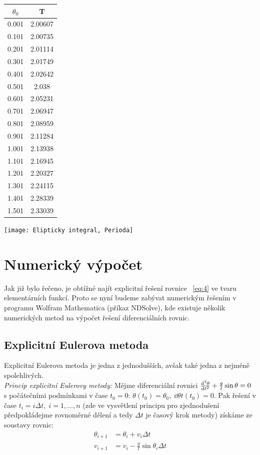 \documentclass[reqno, a4paper]{amsart}
\begin{document}
\begin{minipage}{\textwidth}
\begin{minipage}[b]{0.2\textwidth}
\centering
\begin{tabular}{|c|c|}
\hline
$\theta_{0}$ & T \\ 
\hline
0.001& 2.00607\\0.101& 2.00735\\0.201& 2.01114\\0.301& 2.01749\\0.401& 2.02642\\0.501& 2.038\\0.601& 2.05231\\0.701& 2.06947\\0.801& 2.08959\\0.901& 2.11284\\
1.001& 2.13938\\1.101& 2.16945\\1.201& 2.20327\\1.301& 2.24115\\1.401& 2.28339\\1.501& 2.33039\\
\hline
\end{tabular}
\end{minipage}
\begin{minipage}[b]{0.79\textwidth}
\centering
\texttt{[image: Elipticky integral, Perioda]}
\end{minipage}
\hfill
\end{minipage}

\section{Numerický výpočet}
Jak již bylo řečeno, je obtížné najít explicitní řešení rovnice ~\eqref{eq:4} ve tvaru elementárních funkcí. Proto se nyní budeme zabývat numerickým řešením v programu Wolfram Mathematica (příkaz NDSolve), kde existuje několik numerických metod na výpočet řešení diferenciálních rovnic.
\subsection{Explicitní Eulerova metoda}
Explicitní Eulerova metoda je jedna z jednodušších, avšak také jedna z nejméně spolehlivých.
\\
\textit{Princip explicitní Eulerovy metody:} Mějme diferenciální rovnici $\frac{\mathrm{d}^2 {\theta}}{\mathrm{d} {t}^2} + \frac{g}{l} \sin \theta = 0$ s počátečními podmínkami v čase $t_{0}=0$: $\theta(t_{0})=\theta_{0},\; \dd{\theta}{t}(t_{0})=0$. Pak řešení v čase $t_{i}=i\Delta t,\; i=1,...,n$ (zde ve vysvětlení principu pro zjednodušení předpokládejme rovnoměrné dělení a tedy $ \Delta t$ je časový krok metody) získáme ze soustavy rovnic: 
\begin{align}
	\theta_{i+1}& =\theta_{i}+v_{i}\Delta t\\
	v_{i+1}& =v_{i}-\frac{g}{l}\sin\theta_{i}\Delta t
\end{align}
\end{document}
